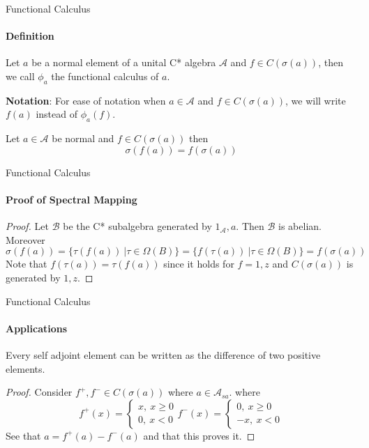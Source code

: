 \documentclass[dvipsnames]{beamer}
\newcommand{\1}{\mathds{1}}	%
\begin{document}
\begin{frame}{Functional Calculus}
  \framesubtitle{Definition}
  \begin{definition}
    Let $a$ be a normal element of a unital C* algebra $\mathcal{A}$ and $f \in C(\sigma(a))$, then we call $\phi_a$ the functional calculus of $a$.
  \end{definition}
  \pause
  \textbf{Notation}: For ease of notation when $a \in \mathcal{A}$ and $f \in C(\sigma(a))$, we will write $f(a)$ instead of $\phi_a(f)$.

  \begin{theorem}
    Let $a \in \mathcal{A}$ be normal and $f \in C(\sigma(a))$ then $$\sigma(f(a)) = f(\sigma(a))$$
  \end{theorem}
\end{frame}

\begin{frame}{Functional Calculus}
  \framesubtitle{Proof of Spectral Mapping}
  \begin{proof}
    Let $\mathcal{B}$ be the C* subalgebra generated by $1_\mathcal{A}, a$. Then $\mathcal{B}$ is abelian. Moreover $$\sigma(f(a)) = \{\tau(f(a)) \ | \tau \in \Omega(B)\} = \{f(\tau(a)) \ | \tau \in \Omega(B) \} = f(\sigma(a))$$
    Note that $f(\tau(a)) = \tau(f(a))$ since it holds for $f = 1, z$ and $C(\sigma(a))$ is generated by $1, z$.
  \end{proof}
\end{frame}

\begin{frame}{Functional Calculus}
  \framesubtitle{Applications}
  \begin{lemma}
    Every self adjoint element can be written as the difference of two positive elements.
  \end{lemma}
  \begin{proof}
    Consider $f^+, f^- \in C(\sigma(a))$ where $a \in \mathcal{A}_{sa}$. where $$f^+(x) = \begin{cases}
    x,  \ x \ge 0 \\
    0,  \ x < 0
  \end{cases}
   f^-(x) = \begin{cases}
     0, \ x \ge 0 \\
     -x, \ x < 0
   \end{cases}$$
  See that $a = f^+(a) - f^-(a)$ and that this proves it.
  \end{proof}
\end{frame}
\end{document}
